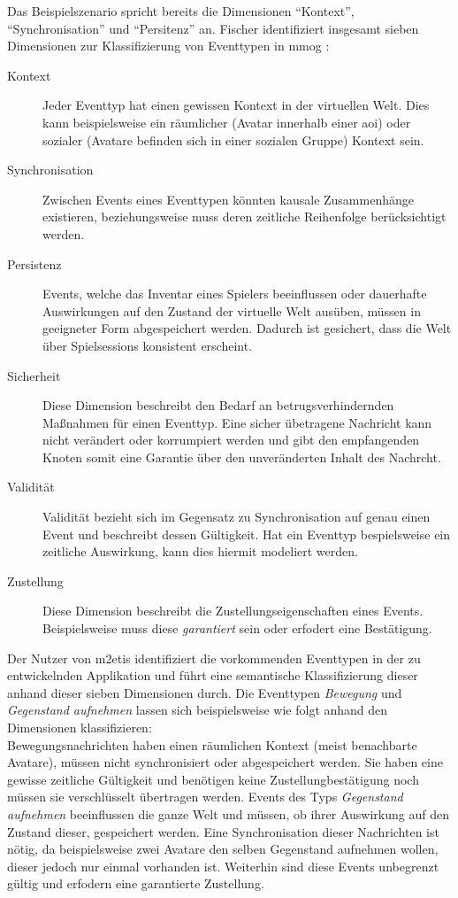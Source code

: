 Das Beispielszenario spricht bereits die Dimensionen \enquote{Kontext}, \enquote{Synchronisation} und \enquote{Persitenz} an. Fischer identifiziert insgesamt sieben Dimensionen zur Klassifizierung von Eventtypen in \ac{mmog} \cite{Fischer2010Event}:

\begin{description}
\item[Kontext] Jeder Eventtyp hat einen gewissen Kontext in der virtuellen Welt. Dies kann beispielsweise ein räumlicher (Avatar innerhalb einer \ac{aoi}) oder sozialer (Avatare befinden sich in einer sozialen Gruppe) Kontext sein.

\item[Synchronisation] Zwischen Events eines Eventtypen könnten kausale Zusammenhänge existieren, beziehungsweise muss deren zeitliche Reihenfolge berücksichtigt werden.

\item[Persistenz] Events, welche das Inventar eines Spielers beeinflussen oder dauerhafte Auswirkungen auf den Zustand der virtuelle Welt ausüben, müssen in geeigneter Form abgespeichert werden. Dadurch ist gesichert, dass die Welt über Spielsessions konsistent erscheint.

\item[Sicherheit] Diese Dimension beschreibt den Bedarf an betrugsverhindernden Maßnahmen für einen Eventtyp. Eine sicher übetragene Nachricht kann nicht verändert oder korrumpiert werden und gibt den empfangenden Knoten somit eine Garantie über den unveränderten Inhalt des Nachrcht.

\item[Validität] Validität bezieht sich im Gegensatz zu Synchronisation auf genau einen Event und beschreibt dessen Gültigkeit. Hat ein Eventtyp bespielsweise ein zeitliche Auswirkung, kann dies hiermit modeliert werden.

\item[Zustellung] Diese Dimension beschreibt die Zustellungseigenschaften eines Events. Beispielsweise muss diese \emph{garantiert} sein oder erfodert eine Bestätigung.
\end{description}

Der Nutzer von \ac{m2etis} identifiziert die vorkommenden Eventtypen in der zu entwickelnden Applikation und führt eine semantische Klassifizierung dieser anhand dieser sieben Dimensionen durch. Die Eventtypen \emph{Bewegung} und \emph{Gegenstand aufnehmen} lassen sich beispielsweise wie folgt anhand den Dimensionen klassifizieren:\\
Bewegungsnachrichten haben einen räumlichen Kontext (meist benachbarte Avatare), müssen nicht synchronisiert oder abgespeichert werden. Sie haben eine gewisse zeitliche Gültigkeit und benötigen keine Zustellungbestätigung noch müssen sie verschlüsselt übertragen werden.
Events des Typs \emph{Gegenstand aufnehmen} beeinflussen die ganze Welt und müssen, ob ihrer Auswirkung auf den Zustand dieser, gespeichert werden. Eine Synchronisation dieser Nachrichten ist nötig, da beispielsweise zwei Avatare den selben Gegenstand aufnehmen wollen, dieser jedoch nur einmal vorhanden ist. Weiterhin sind diese Events unbegrenzt gültig und erfodern eine garantierte Zustellung.




